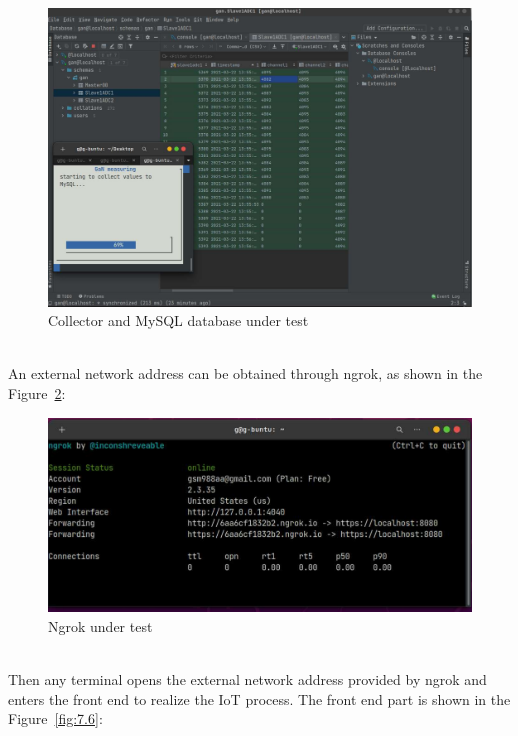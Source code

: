 \begin{figure}[!ht]
	\centering
	\includegraphics[width=16cm]{grafiken/collector.pdf}
	\caption{Collector and MySQL database under test}
	\label{fig:7.4}
\end{figure}
\FloatBarrier
\\
An external network address can be obtained through ngrok, as shown in the Figure~\ref{fig:7.5}:
\begin{figure}[!ht]
	\centering
	\includegraphics[width=12cm]{grafiken/ngrok.pdf}
	\caption{Ngrok under test}
	\label{fig:7.5}
\end{figure}
\FloatBarrier
\\
Then any terminal opens the external network address provided by ngrok and enters the front end to realize the IoT process. The front end part is shown in the Figure~\ref{fig:7.6}:

